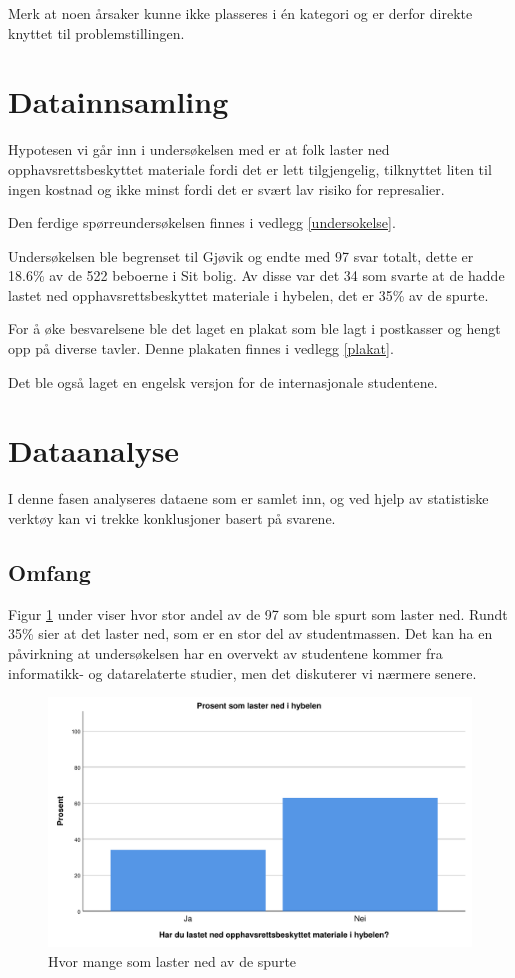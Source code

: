 Merk at noen årsaker kunne ikke plasseres i én kategori og er derfor direkte knyttet til problemstillingen.


\section{Datainnsamling}
Hypotesen vi går inn i undersøkelsen med er at folk laster ned opphavsrettsbeskyttet materiale fordi det er lett tilgjengelig, tilknyttet liten til ingen kostnad og ikke minst fordi det er svært lav risiko for represalier. 

Den ferdige spørreundersøkelsen finnes i vedlegg \ref{undersokelse}. 

Undersøkelsen ble begrenset til Gjøvik og endte med 97 svar totalt, dette er 18.6\% av de 522 beboerne i Sit bolig. Av disse var det 34 som svarte at de hadde lastet ned opphavsrettsbeskyttet materiale i hybelen, det er 35\% av de spurte. 

For å øke besvarelsene ble det laget en plakat som ble lagt i postkasser og hengt opp på diverse tavler. Denne plakaten finnes i vedlegg \ref{plakat}.

Det ble også laget en engelsk versjon for de internasjonale studentene. 

\section{Dataanalyse}
I denne fasen analyseres dataene som er samlet inn, og ved hjelp av statistiske verktøy kan vi trekke konklusjoner basert på svarene. 

\subsection{Omfang}
Figur \ref{fig:case1-lasterned} under viser hvor stor andel av de 97 som ble spurt som laster ned. Rundt 35\% sier at det laster ned, som er en stor del av studentmassen. Det kan ha en påvirkning at undersøkelsen har en overvekt av studentene kommer fra informatikk- og datarelaterte studier, men det diskuterer vi nærmere senere. 

\begin{figure}[H]
    \centering
    \includegraphics[scale=0.45]{case_1/bilder/lasterned.pdf}
    \caption[Hvor mange som laster ned]{Hvor mange som laster ned av de spurte}
    \label{fig:case1-lasterned}
\end{figure}


